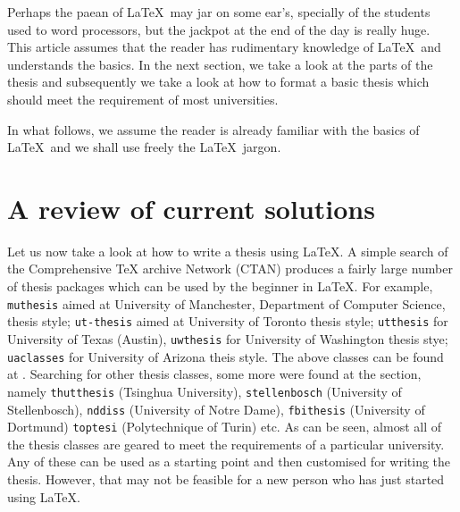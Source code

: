 \documentclass{pracjourn}
\begin{document}
Perhaps the paean of \LaTeX\ may jar on some ear's, specially of the students
used to word processors, but the jackpot  at the end of the day is really huge.
This article assumes that the reader has rudimentary knowledge of \LaTeX\ and
understands the basics. In the next section,  we take a look at the parts of
the thesis and subsequently we take a look at how to format a basic thesis
which should meet the requirement of most universities.

In what follows, we assume the reader is already familiar with the basics of
\LaTeX\ and we shall use freely the \LaTeX\ jargon.

\section{A review of current solutions}

Let us now take a look at how to write a thesis using \LaTeX. A simple search
of the Comprehensive  \TeX{} archive Network (CTAN) produces a fairly large
number of thesis packages which can be used by the beginner in \LaTeX. For
example, \texttt{muthesis} \cite{MUTHESIS} aimed at University of Manchester,
Department of Computer Science, thesis style;   \texttt{ut-thesis}
\cite{UTTHESIS1} aimed at University of Toronto thesis style; \texttt{utthesis}
\cite{UTTHESIS}for University of Texas (Austin), \texttt{uwthesis}
\cite{UWTHESIS} for University of Washington thesis stye; \texttt{uaclasses}
\cite{UACLASSES} for University of Arizona theis style. The above classes can
be found at . Searching for other thesis
classes, some more were found at the  section, namely
\texttt{thutthesis} (Tsinghua University), \texttt{stellenbosch} (University of
Stellenbosch), \texttt{nddiss} (University of Notre Dame), \texttt{fbithesis}
(University of Dortmund) \texttt{toptesi} (Polytechnique of Turin) etc. As can
be seen, almost all of the thesis classes are geared to meet the requirements
of a particular university. Any of these can be used as a starting point and
then customised for writing the thesis. However, that may not be feasible for a
new person who has just started using \LaTeX.
\end{document}

